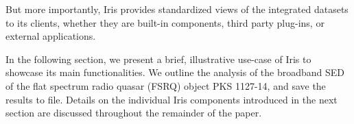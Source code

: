 \documentclass[final,5p,authoryear]{elsarticle}
\begin{document}
But more importantly, Iris provides standardized views of the integrated
datasets to its clients, whether they are built-in components, third party
plug-ins, or external applications.


In the following section, we present a brief, illustrative use-case
of Iris to showcase its main functionalities. We outline the analysis of the broadband SED
of the flat spectrum radio quasar (FSRQ) object PKS 1127-14, and save the
results to file. Details on the individual Iris components introduced in the next section 
are discussed throughout the remainder of the paper.




\end{document}
